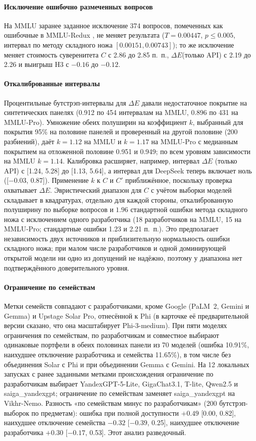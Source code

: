 \documentclass[preprint,12pt,authoryear]{elsarticle}
\newcommand{\dE}{\Delta E}
\begin{document}
\paragraph{Исключение ошибочно размеченных вопросов} На MMLU заранее заданное исключение 374 вопросов, помеченных как ошибочные в MMLU-Redux \citep{gema2025mmlu}, не меняет результата ($T=0.00447$, $p\le0.005$, интервал по методу складного ножа $[0.00151, 0.00743]$); то же исключение меняет стоимость суверенитета $C$ с 2.86 до 2.85 п.~п., $\dE$(только API) с 2.19 до 2.26 и выигрыш H3 с $-0.16$ до $-0.12$.

\paragraph{Откалиброванные интервалы} Процентильные бутстрэп-интервалы для $\dE$ давали недостаточное покрытие на синтетических панелях (0.912 по 454 интервалам на MMLU, 0.896 по 431 на MMLU-Pro). Умножение обеих полуширин на коэффициент $k$, выбранный для покрытия 95\% на половине панелей и проверенный на другой половине (200 разбиений), даёт $k=1.12$ на MMLU и $k=1.17$ на MMLU-Pro с медианным покрытием на отложенной половине 0.951 и 0.949; по всем уровням зависимости на MMLU $k=1.14$. Калибровка расширяет, например, интервал $\dE$ (только API) с [1.24, 5.28] до [1.13, 5.64], а интервал для DeepSeek теперь включает ноль ([$-0.03$, 0.87]). Применение $k$ к $C$ и $C'$ приближённое, поскольку проверка охватывает $\dE$. Эвристический диапазон для $C$ с учётом выборки моделей складывает в квадратурах, отдельно для каждой стороны, откалиброванную полуширину по выборке вопросов и $1.96$ стандартной ошибки метода складного ножа с исключением одного разработчика (18 разработчиков на MMLU, 15 на MMLU-Pro; стандартные ошибки 1.23 и 2.21 п.~п.). Это предполагает независимость двух источников и приблизительную нормальность ошибки складного ножа; при малом числе разработчиков и одной доминирующей открытой модели ни одно из допущений не надёжно, поэтому у диапазона нет подтверждённого доверительного уровня.

\paragraph{Ограничение по семействам} Метки семейств совпадают с разработчиками, кроме Google (PaLM~2, Gemini и Gemma) и Upstage Solar Pro, отнесённой к Phi (в карточке её предварительной версии сказано, что она масштабирует Phi-3-medium). При пяти моделях ограничения по семействам, по разработчикам и совместное выбирают одинаковые портфели в обеих половинах панели из 70 моделей (ошибка 10.91\%, наихудшее отключение разработчика и семейства 11.65\%), в том числе без объединения Solar с Phi и при объединении Gemma с Gemini. На 12 локальных запусках с ранее заданными метками происхождения ограничение по разработчикам выбирает YandexGPT-5-Lite, GigaChat3.1, T-lite, Qwen2.5 и saiga\_yandexgpt; ограничение по семействам заменяет saiga\_yandexgpt на Vikhr-Nemo. Разность «по семействам минус по разработчикам» (200 бутстрэп-выборок по предметам): ошибка при полной доступности $+0.49$ [0.00, 0.82], наихудшее отключение семейства $-0.32$ [$-0.39$, 0.25], наихудшее отключение разработчика $+0.30$ [$-0.17$, 0.53]. Этот анализ разведочный.
\end{document}
